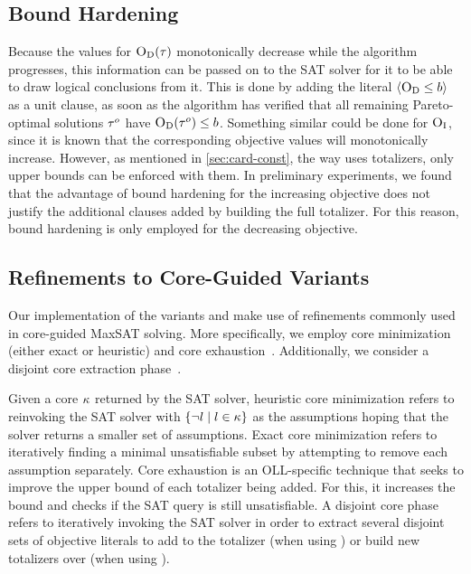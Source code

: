 \subsection{Bound Hardening}

Because the values for $\textsc{O}_{\text{D}}(\tau)$ monotonically decrease while the algorithm progresses, this information can be passed on to the SAT solver for it to be able to draw logical conclusions from it.
This is done by adding the literal $\langle \textsc{O}_{\text{D}} \leq b \rangle$ as a unit clause, as soon as the algorithm has verified that all remaining Pareto-optimal solutions $\tau^o$ have $\textsc{O}_{\text{D}}(\tau^o)\le b$.
Something similar could be done for $\textsc{O}_{\text{I}}$, since it is known that the corresponding objective values will monotonically increase.
However, as mentioned in \cref{sec:card-const}, the way \algname{} uses totalizers, only upper bounds can be enforced with them.
In preliminary experiments, we found that the advantage of bound hardening for the increasing objective does not justify the additional clauses added by building the full totalizer.
For this reason, bound hardening is only employed for the decreasing objective.

\subsection{Refinements to Core-Guided Variants}

Our implementation of the \algname{} variants \msu{} and \oll{} make use of refinements commonly used in core-guided MaxSAT solving.
More specifically, we employ core minimization~\autocite{DBLP:journals/jsat/IgnatievMM19} (either exact or heuristic) and core exhaustion~\autocites{DBLP:journals/jsat/IgnatievMM19,DBLP:conf/cp/AnsoteguiBGL13}.
Additionally, we consider a disjoint core extraction phase~\autocite{DBLP:conf/cp/DaviesB11}.

Given a core $\kappa$ returned by the SAT solver, heuristic core minimization refers to reinvoking the SAT solver with $\{\lnot l \mid l \in \kappa\}$ as the assumptions hoping that the solver returns a smaller set of assumptions.
Exact core minimization refers to iteratively finding a minimal unsatisfiable subset by attempting to remove each assumption separately.
Core exhaustion is an OLL-specific technique that seeks to improve the upper bound of each totalizer being added.
For this, it increases the bound and checks if the SAT query is still unsatisfiable.
A disjoint core phase refers to iteratively invoking the SAT solver in order to extract several disjoint sets of objective literals to add to the totalizer (when using \msu{}) or build new totalizers over (when using \oll{}).